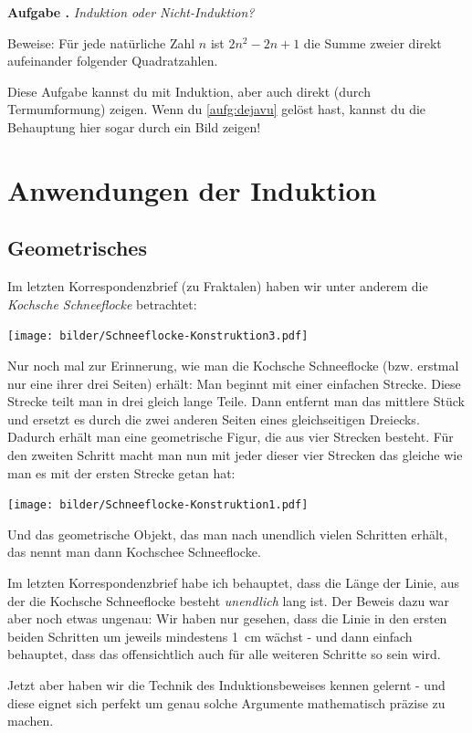 \documentclass[a4paper,ngerman,12pt]{scrartcl}
\theoremstyle{definition}
\theoremstyle{plain}
\theoremstyle{remark}
\newlength{\aufgabenskip}
\newcounter{aufgabennummer}
\newenvironment{aufgabe}[1]{
	\refstepcounter{aufgabennummer}
	\textbf{Aufgabe \theaufgabennummer.} \emph{#1} \par
}{\vspace{\aufgabenskip}}
\begin{document}
\begin{aufgabe}{Induktion oder Nicht-Induktion?}
	Beweise: Für jede natürliche Zahl $n$ ist $2n^2-2n+1$ die Summe zweier direkt aufeinander folgender Quadratzahlen.
	
	Diese Aufgabe kannst du mit Induktion, aber auch direkt (durch Termumformung) zeigen. Wenn du \cref{aufg:dejavu} gelöst hast, kannst du die Behauptung hier sogar durch ein Bild zeigen!
\end{aufgabe}


\section{Anwendungen der Induktion}

\subsection{Geometrisches}

Im letzten Korrespondenzbrief (zu Fraktalen) haben wir unter anderem die \emph{Kochsche Schneeflocke} betrachtet:
\begin{center}
	\texttt{[image: bilder/Schneeflocke-Konstruktion3.pdf]}
\end{center}
Nur noch mal zur Erinnerung, wie man die Kochsche Schneeflocke (bzw. erstmal nur eine ihrer drei Seiten) erhält: Man beginnt mit einer einfachen Strecke. Diese Strecke teilt man in drei gleich lange Teile. Dann entfernt man das mittlere Stück und ersetzt es durch die zwei anderen Seiten eines gleichseitigen Dreiecks. Dadurch erhält man eine geometrische Figur, die aus vier Strecken besteht. Für den zweiten Schritt macht man nun mit jeder dieser vier Strecken das gleiche wie man es mit der ersten Strecke getan hat:
\begin{center}
	\texttt{[image: bilder/Schneeflocke-Konstruktion1.pdf]}
\end{center}
Und das geometrische Objekt, das man \glqq nach unendlich vielen Schritten\grqq{} erhält, das nennt man dann Kochschee Schneeflocke.

Im letzten Korrespondenzbrief habe ich behauptet, dass die Länge der Linie, aus der die Kochsche Schneeflocke besteht \emph{unendlich} lang ist. Der Beweis dazu war aber noch etwas ungenau: Wir haben nur gesehen, dass die Linie in den ersten beiden Schritten um jeweils mindestens \SI{1}{\cm} wächst - und dann einfach behauptet, dass das \glqq offensichtlich\grqq{} auch für alle weiteren Schritte so sein wird.

Jetzt aber haben wir die Technik des Induktionsbeweises kennen gelernt - und diese eignet sich perfekt um genau solche Argumente mathematisch präzise zu machen. 
\end{document}
